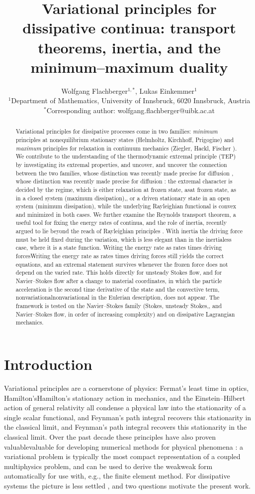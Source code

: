 \documentclass[12pt]{article}
\title{Variational principles for dissipative continua: transport theorems, inertia, and the minimum--maximum duality}
\author{Wolfgang Flachberger$^{1,*}$, Lukas Einkemmer$^{1}$ \\[6pt]
\small $^1$Department of Mathematics, University of Innsbruck, 6020 Innsbruck, Austria \\
\small $^*$Corresponding author: wolfgang.flachberger@uibk.ac.at}
\date{}
\newif\ifhighlight \highlightfalse
\newif\ifhighlightfirst \highlightfirstfalse
\DeclareRobustCommand{\chg}[1]{\ifhighlight\ifhighlightfirst\textcolor{revised}{#1}\else#1\fi\else#1\fi}
\begin{document}
\maketitle

\begin{abstract}
Variational principles for dissipative processes come in two families: \textit{minimum} principles at nonequilibrium stationary states (Helmholtz, Kirchhoff, Prigogine) and \textit{maximum} principles for relaxation in continuum mechanics (Ziegler, Hackl, Fischer \cite{ziegler1963, hackl2008}). We contribute to the understanding of the thermodynamic extremal principle (TEP) by investigating its extremal properties\chg{, and uncover} the connection between the two families\chg{, whose distinction was recently made precise for diffusion \cite{svoboda2023note}}: the extremal character is decided by the regime, which is either relaxation \chg{at frozen state, as} in a closed system (maximum dissipation)\chg{,} or a driven stationary state in an open system (minimum dissipation), while the underlying Rayleighian functional is convex and minimized in both cases. We further examine the Reynolds transport theorem, a useful tool for fixing the energy rates of continua, and the role of inertia, recently argued to lie beyond the reach of Rayleighian principles \cite{beris2024}. With inertia the driving force must be held fixed during the variation, which is less elegant than in the inertialess case, where it is a state function. \chg{Writing the energy rate as rates times driving forces} still yields the correct equations, and an extremal statement survives whenever the frozen force does not depend on the varied rate. This holds directly for unsteady Stokes flow, and for Navier--Stokes flow after a change to material coordinates, in which the particle acceleration is the second time derivative of the state and the convective term, \chg{nonvariational} in the Eulerian description, does not appear. The framework is tested on the Navier--Stokes family (Stokes, unsteady Stokes\chg{,} and Navier--Stokes flow, in order of increasing complexity) and on dissipative Lagrangian mechanics.
\end{abstract}


\section{Introduction}

Variational principles are a cornerstone of physics: Fermat's least time in optics, \chg{Hamilton's} stationary action in mechanics, and the Einstein--Hilbert action of general relativity all condense a physical law into the stationarity of a single scalar functional\chg{, and Feynman's path integral recovers this stationarity in the classical limit}. Over the past decade these principles have also proven \chg{valuable} for developing numerical methods for physical phenomena \cite{flachberger2024, beronvera2021}: a variational problem is typically the most compact representation of a coupled multiphysics problem, and can be used to derive the \chg{weak} form automatically for use with, e.g., the finite element method. For dissipative systems the picture is less settled \cite{martyushev2006}, and two questions motivate the present work.
\end{document}
